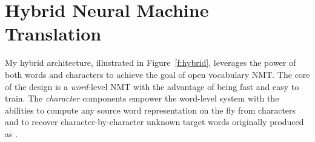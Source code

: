 %
%

\section{Hybrid Neural Machine Translation}
\label{sec:hybrid}
My hybrid architecture, illustrated in Figure~\ref{f:hybrid}, leverages the power of both words
and characters to achieve the goal of open vocabulary NMT. The core of the
design is a {\it word}-level NMT with the advantage of being fast and easy to
train.
The {\it character} components empower the 
word-level system with the abilities to compute any source word representation on the fly from 
characters and to recover character-by-character unknown target words
originally produced as \unk{}.

